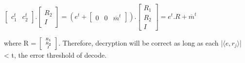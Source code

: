 \documentclass[conference]{IEEEtran}
\begin{document}
\begin{center}
$\left[
\begin{array}{cc}
   c^t_1 & c^t_2
\end{array}
\right] .
\left[
\begin{array}{c}
    R_2 \\ 
    I
\end{array}
\right] = (e^t + 
\left[
\begin{array}{ccc}
   0 & 0 & \overline{m}^t 
\end{array}
\right] ).
\left[
\begin{array}{c}
    R_1 \\
    R_2 \\ 
    I
\end{array}
\right] = e^t.R + \overline{m}^t$
\end{center}

where R = 
$\tiny\left[
\begin{array}{c}
    R_1 \\
    R_2 \\ 
    I
\end{array}
\right]$.
Therefore, decryption will be correct as long as each |$\langle e,r_j \rangle$| < t, the error threshold of decode.
\end{document}
